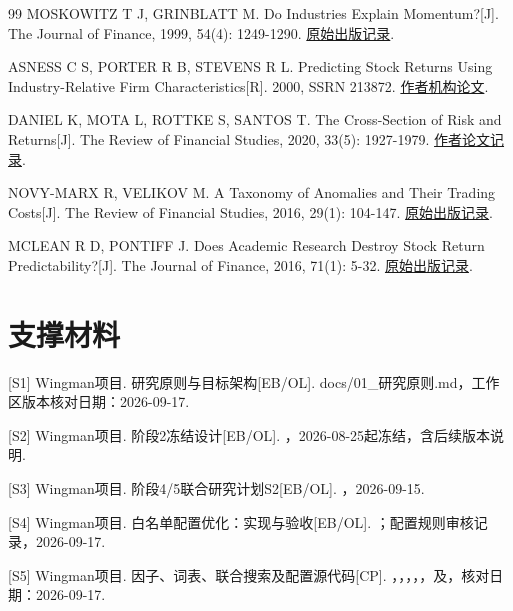 \documentclass[UTF8,12pt,a4paper,fontset=none]{ctexart}
\begin{document}
\begin{thebibliography}{99}
 MOSKOWITZ T J, GRINBLATT M. Do Industries Explain Momentum?[J]. The Journal of Finance, 1999, 54(4): 1249-1290. \href{https://doi.org/10.1111/0022-1082.00146}{原始出版记录}.

 ASNESS C S, PORTER R B, STEVENS R L. Predicting Stock Returns Using Industry-Relative Firm Characteristics[R]. 2000, SSRN 213872. \href{https://www.aqr.com/Insights/Research/Working-Paper/Predicting-Stock-Returns-Using-IndustryRelative-Firm-Characteristics}{作者机构论文}.

 DANIEL K, MOTA L, ROTTKE S, SANTOS T. The Cross-Section of Risk and Returns[J]. The Review of Financial Studies, 2020, 33(5): 1927-1979. \href{https://www.kentdaniel.net/research.php}{作者论文记录}.

 NOVY-MARX R, VELIKOV M. A Taxonomy of Anomalies and Their Trading Costs[J]. The Review of Financial Studies, 2016, 29(1): 104-147. \href{https://doi.org/10.1093/rfs/hhv063}{原始出版记录}.

 MCLEAN R D, PONTIFF J. Does Academic Research Destroy Stock Return Predictability?[J]. The Journal of Finance, 2016, 71(1): 5-32. \href{https://doi.org/10.1111/jofi.12365}{原始出版记录}.

\end{thebibliography}
\section*{支撑材料}\raggedright
[S1] Wingman项目. 研究原则与目标架构[EB/OL]. \textnormal{docs/01\_研究原则.md}，工作区版本核对日期：2026-09-17.


[S2] Wingman项目. 阶段2冻结设计[EB/OL]. ，2026-08-25起冻结，含后续版本说明.


[S3] Wingman项目. 阶段4/5联合研究计划S2[EB/OL]. ，2026-09-15.


[S4] Wingman项目. 白名单配置优化：实现与验收[EB/OL]. ；配置规则审核记录，2026-09-17.


[S5] Wingman项目. 因子、词表、联合搜索及配置源代码[CP]. ，，，，，及，核对日期：2026-09-17.
\end{document}
